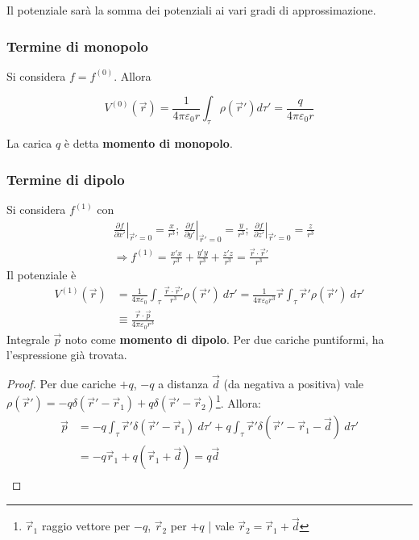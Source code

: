 \documentclass[a4paper]{scrartcl}
\newcommand*\Eval[3]{\left.#1\right\rvert_{#2}^{#3}}
\numberwithin{equation}{subsection}
\theoremstyle{style1}
\newenvironment{boxenv}[1][]{
    \begin{eqbox}[#1]
    }{
   \end{eqbox}
}
\begin{document}
\noindent Il potenziale sar\`a la somma dei potenziali ai vari gradi di approssimazione. 

\subsubsection{Termine di monopolo}
Si considera $f=f^{(0)} $. Allora
\begin{boxenv}[]
\begin{equation}
	V^{(0)} (\vec{r}) = \frac{1}{4 \pi \varepsilon _0 r}\int_{\tau } \rho (\vec{r}') d\tau '= \frac{q}{4\pi\varepsilon _0r}
\end{equation}
\end{boxenv}
\noindent La carica $q$ \`e detta \textbf{momento di monopolo}.

\subsubsection{Termine di dipolo}

Si considera $f^{(1)} $ con
\begin{equation}
	\begin{split}
		&\Eval{\frac{\partial f}{\partial x'} }{\vec{r}'=0}{} = \frac{x}{r^3}; \ \Eval{\frac{\partial f}{\partial y'} }{\vec{r}'=0}{} = \frac{y}{r^3}; \ \Eval{\frac{\partial f}{\partial z'} }{\vec{r}'=0}{} = \frac{z}{r^3}\\
		&\Rightarrow f^{(1)} = \frac{x'x}{r^3} + \frac{y'y}{r^3} + \frac{z'z}{r^3} = \frac{\vec{r}\cdot \vec{r}' }{r^3}
	\end{split}
\end{equation}
Il potenziale \`e
\begin{equation}
	\begin{split}
		V^{(1)} (\vec{r}) &= \frac{1}{4 \pi \varepsilon _0} \int_{\tau } \frac{\vec{r}\cdot \vec{r}'}{r^3}\rho (\vec{r}') \ d\tau '= \frac{1}{4\pi \varepsilon _0 r^3}\vec{r} \int_{\tau } \vec{r}' \rho (\vec{r}') \ d\tau '\\
				  &\equiv \frac{\vec{r}\cdot \vec{p}}{4\pi \varepsilon _0r^3}
	\end{split}
\end{equation}
Integrale $\vec{p}$ noto come \textbf{momento di dipolo}. Per due cariche puntiformi, ha l'espressione gi\`a trovata.
\begin{boxenv}[]
\begin{proof}
	Per due cariche $+q$, $-q$ a distanza $\vec{d}$ (da negativa a positiva) vale $\rho (\vec{r}') = -q \delta (\vec{r}' - \vec{r}_1) + q \delta (\vec{r}'-\vec{r}_2)$\footnote{$\vec{r}_1$ raggio vettore per $-q$, $\vec{r}_2$ per $+q$ | vale $\vec{r}_2 = \vec{r}_1 +\vec{d}$}. Allora:
	\begin{equation}
		\begin{split}
			\vec{p}&= -q \int_{\tau } \vec{r}' \delta (\vec{r}' - \vec{r}_1) \ d\tau ' + q \int_{\tau } \vec{r}' \delta (\vec{r}' - \vec{r}_1 - \vec{d}) \ d\tau ' \\
			&= -q \vec{r}_1 + q (\vec{r}_1 + \vec{d}) = q \vec{d} \\
		\end{split}
	\end{equation}
\end{proof}
\end{boxenv}
\end{document}
